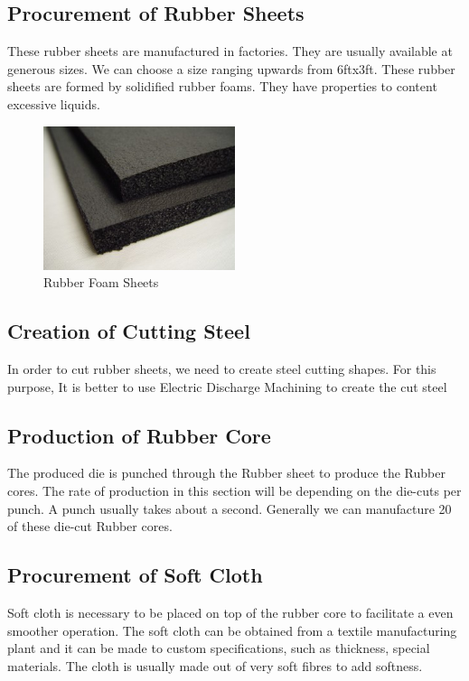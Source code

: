 \documentclass[12pt,a4paper,oneside]{article}
\begin{document}
\subsection{Procurement of Rubber Sheets}

These rubber sheets are manufactured in factories. They are usually available at generous sizes. We can choose a size ranging upwards from 6ftx3ft. These rubber sheets are formed by solidified rubber foams. They have properties to content excessive liquids. 

\begin{figure}[h]
    \centering
    \includegraphics[width=0.5\textwidth]{rubber-foam}
    \caption{Rubber Foam Sheets}
\end{figure}



\subsection{Creation of Cutting Steel}

In order to cut rubber sheets, we need to create steel cutting shapes. For this purpose, It is better to use Electric Discharge Machining to create the cut steel

\subsection{Production of Rubber Core}

The produced die is punched through the Rubber sheet to produce the Rubber cores. The rate of production in this section will be depending on the die-cuts per punch. A punch usually takes about a second. Generally we can manufacture 20 of these die-cut Rubber cores. 

\subsection{Procurement of Soft Cloth}

Soft cloth is necessary to be placed on top of the rubber core to facilitate a even smoother operation. The soft cloth can be obtained from a textile manufacturing plant and it can be made to custom specifications, such as thickness, special materials. The cloth is usually made out of very soft fibres to add softness.
\end{document}

